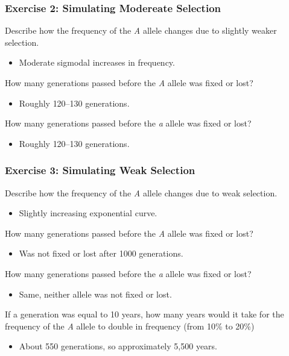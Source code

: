 \documentclass[12pt,a4paper]{article}
\begin{document}
\begin{enumerate}
    \subsubsection*{Exercise 2: Simulating Modereate Selection}
    {\color{darklc}\item Describe how the frequency of the \textit{A} allele changes due to slightly weaker selection.}
        \begin{itemize}
            \item Moderate sigmodal increases in frequency.
        \end{itemize}
    {\color{darklc}\item How many generations passed before the \textit{A} allele was fixed or lost?}
        \begin{itemize}
            \item Roughly {\color{o-Sun}120--130} generations.
        \end{itemize}
    {\color{darklc}\item How many generations passed before the \textit{a} allele was fixed or lost?}
        \begin{itemize}
            \item Roughly {\color{o-Sun}120--130} generations.
        \end{itemize}
    \subsubsection*{Exercise 3: Simulating Weak Selection}
    {\color{darklc}\item Describe how the frequency of the \textit{A} allele changes due to weak selection.}
        \begin{itemize}
            \item {\color{pos}Slightly increasing} exponential curve. 
        \end{itemize}
    {\color{darklc}\item How many generations passed before the \textit{A} allele was fixed or lost?}
        \begin{itemize}
            \item Was not fixed or lost after 1000 generations.
        \end{itemize}
    {\color{darklc}\item How many generations passed before the \textit{a} allele was fixed or lost?}
        \begin{itemize}
            \item Same, neither allele was not fixed or lost.
        \end{itemize}
    {\color{darklc}\item If a generation was equal to 10 years, how many years would it take for the frequency of the \textit{A} allele to double in frequency (from 10\% to 20\%)}
        \begin{itemize}
            \item About 550 generations, so approximately {\color{o-Sun}5,500} years.
        \end{itemize}
\end{enumerate}
\end{document}
